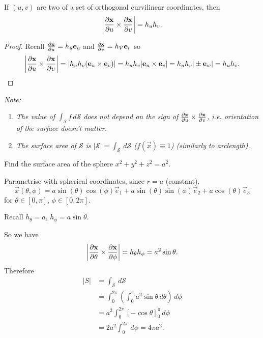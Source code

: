 \documentclass[10pt, a4paper]{article}
\begin{document}
\begin{proposition}
    If $(u, v)$ are two of a set of orthogonal curvilinear coordinates,
    then
    \[
    \left|\pd[\vec{x}]{u} \times \pd[\vec{x}]{v}\right| = h_uh_v.
    \]

    \begin{proof}
        Recall $\pd[\vec{x}]{u} = h_u\vec{e}_u$ and $\pd[\vec{x}]{v} = h_V\vec{e}_v$ so
        \[
        \left|\pd[\vec{x}]{u} \times \pd[\vec{x}]{v}\right| = |h_uh_v(\vec{e}_u \times \vec{e}_v)| = h_uh_v|\vec{e}_u \times \vec{e}_v| = h_uh_v|\pm\vec{e}_w| = h_uh_v.
        \]
    \end{proof}
\end{proposition}

\textit{Note:}
\begin{enumerate}[label = (\textit{\arabic*})]
    \item
    \textit{The value of $\int_{\mathcal{S}}f\,d\mathcal{S}$ does not depend on the sign of $\pd[\vec{x}]{u} \times \pd[\vec{x}]{v}$,
    i.e. orientation of the surface doesn't matter.}
    
    \item
    \textit{The surface area of $\mathcal{S}$ is $|\mathcal{S}| = \int_{\mathcal{S}}\,d\mathcal{S}$
    ($f(\vec{x}) \equiv 1$)
    (similarly to arclength).}
\end{enumerate}

\begin{example}
    Find the surface area of the sphere $x ^ 2 + y ^ 2 + z ^ 2 = a ^ 2$.

    \begin{solution}
        Parametrise with spherical coordinates,
        since $r = a$
        (constant).
        \[
        \vec{x}(\theta, \phi) = a\sin(\theta)\cos(\phi)\vec{e}_1 + a\sin(\theta)\sin(\phi)\vec{e}_2 + a\cos(\theta)\vec{e}_3
        \]
        for $\theta \in [0, \pi]$,
        $\phi \in [0, 2\pi]$.

        Recall $h_{\theta} = a$,
        $h_{\phi} = a\sin{\theta}$.

        So we have
        \[
        \left|\pd[\vec{x}]{\theta} \times \pd[\vec{x}]{\phi}\right| = h_{\theta}h_{\phi} = a ^ 2\sin{\theta}.
        \]
        Therefore
        \begin{align*}
            |S| &= \int_{\mathcal{S}}\,d\mathcal{S} \\
            &= \int_{0}^{2\pi}\left(\int_{0}^{\pi}a ^ 2\sin{\theta}\,d\theta\right)\,d\phi \\
            &= a ^ 2 \int_{0}^{2\pi}\left[-\cos{\theta}\right]_{0}^{\pi}\,d\phi \\
            &= 2a ^ 2\int_{0}^{2\pi}\,d\phi = 4\pi a ^ 2.
        \end{align*}
    \end{solution}
\end{example}
\end{document}
